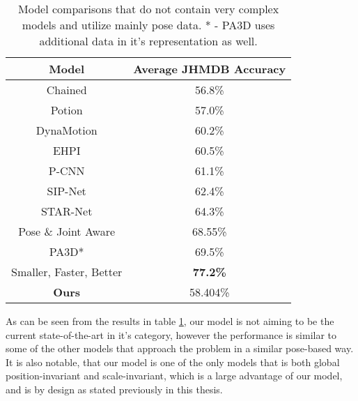 \begin{table}[ht]
	\centering
	\begin{tabular}{||c c||} 
		\hline
		\textbf{Model} & \textbf{Average JHMDB Accuracy} \\
		\hline\hline
		Chained \cite{Chained} & 56.8\% \\
		Potion \cite{potion} & 57.0\% \\
		DynaMotion \cite{dynamic-motion} & 60.2\% \\
		EHPI \cite{simple_yet_efficient} & 60.5\% \\
		P-CNN \cite{PCNN} & 61.1\% \\
		SIP-Net \cite{sipnet} & 62.4\% \\
		STAR-Net \cite{star-net} & 64.3\% \\
		Pose \& Joint Aware \cite{poseandjointaware} & 68.55\% \\
		PA3D* \cite{PA3D} & 69.5\% \\
		Smaller, Faster, Better \cite{smaller_faster_better} & \textbf{77.2\%} \\
		\hline\hline
		\textbf{Ours} & 58.404\% \\
		\hline
	\end{tabular}
	\caption{Model comparisons that do not contain very complex models and utilize mainly pose data. * - PA3D uses additional data in it's representation as well.}
	\label{tab:model-comparison}
\end{table}

As can be seen from the results in table \ref{tab:model-comparison}, our model is not aiming to be the current state-of-the-art in it's category, however the performance is similar to some of the other models that approach the problem in a similar pose-based way. It is also notable, that our model is one of the only models that is both global position-invariant and scale-invariant, which is a large advantage of our model, and is by design as stated previously in this thesis.